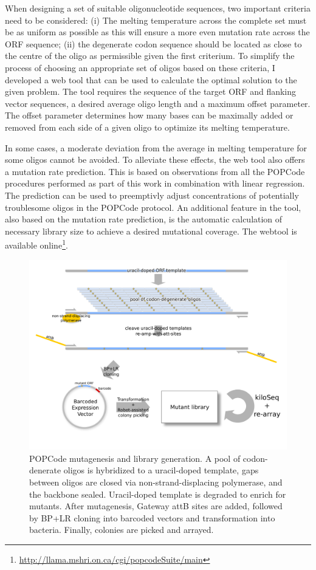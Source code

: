 When designing a set of suitable oligonucleotide sequences, two important criteria need to be considered: 
(i) The melting temperature across the complete set must be as uniform as possible as this will ensure a more even mutation rate across the ORF sequence; (ii) the degenerate codon sequence should be located as close to the centre of the oligo as permissible given the first criterium. To simplify the process of choosing an appropriate set of oligos based on these criteria, I developed a web tool that can be used to calculate the optimal solution to the given problem. The tool requires the sequence of the target ORF and flanking vector sequences, a desired average oligo length and a maximum offset parameter. The offset parameter determines how many bases can be maximally added or removed from each side of a given oligo to optimize its melting temperature. 

In some cases, a moderate deviation from the average in melting temperature for some oligos cannot be avoided. To alleviate these effects, the web tool also offers a mutation rate prediction. This is based on observations from all the POPCode procedures performed as part of this work in combination with linear regression. The prediction can be used to preemptivly adjust concentrations of potentially troublesome oligos in the POPCode protocol. An additional feature in the tool, also based on the mutation rate prediction, is the automatic calculation of necessary library size to achieve a desired mutational coverage. The webtool is available online\footnote{\url{http://llama.mshri.on.ca/cgi/popcodeSuite/main}}.


\begin{figure}[h!]
	\centering
	\includegraphics[width=\textwidth]{img/popcode_schema.pdf}
	\caption{POPCode mutagenesis and library generation. A pool of codon-denerate oligos is hybridized to a uracil-doped template, gaps between oligos are closed via non-strand-displacing polymerase, and the backbone sealed. Uracil-doped template is degraded to enrich for mutants. After mutagenesis, Gateway attB sites are added, followed by BP+LR cloning into barcoded vectors and transformation into bacteria. Finally, colonies are picked and arrayed.}
	\label{fig:popcode_schema}
\end{figure}


